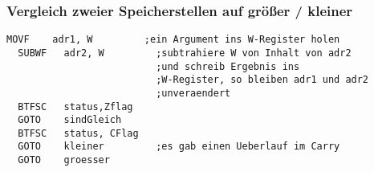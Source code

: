 \subsubsection*{Vergleich zweier Speicherstellen auf größer / kleiner}
\begin{lstlisting}[language=avr]
  MOVF    adr1, W         ;ein Argument ins W-Register holen
  SUBWF   adr2, W         ;subtrahiere W von Inhalt von adr2
                          ;und schreib Ergebnis ins 
                          ;W-Register, so bleiben adr1 und adr2
                          ;unveraendert
  BTFSC   status,Zflag
  GOTO    sindGleich
  BTFSC   status, CFlag
  GOTO    kleiner         ;es gab einen Ueberlauf im Carry
  GOTO    groesser        
  \end{lstlisting}